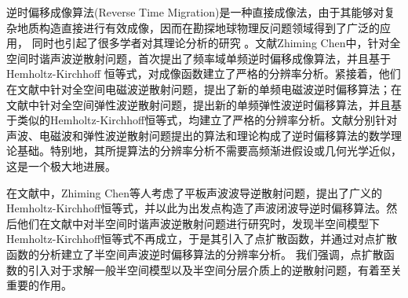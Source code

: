 逆时偏移成像算法(Reverse Time Migration)是一种直接成像法，由于其能够对复杂地质构造直接进行有效成像，因而在勘探地球物理反问题领域得到了广泛的应用，
同时也引起了很多学者对其理论分析的研究
。文献Zhiming Chen\cite{cch_a}中，针对全空间时谐声波逆散射问题，首次提出了频率域单频逆时偏移成像算法，并且基于Hemholtz-Kirchhoff 恒等式，对成像函数建立了严格的分辨率分析。紧接着，他们在文献\cite{cch_e}中针对全空间电磁波逆散射问题，提出了新的单频电磁波逆时偏移算法；在文献\cite{ch_e}中针对全空间弹性波逆散射问题，提出新的单频弹性波逆时偏移算法，并且基于类似的Hemholtz-Kirchhoff恒等式，均建立了严格的分辨率分析。文献\cite{cch_a,cch_e,ch_e}分别针对声波、电磁波和弹性波逆散射问题提出的算法和理论构成了逆时偏移算法的数学理论基础。特别地，其所提算法的分辨率分析不需要高频渐进假设或几何光学近似，这是一个极大地进展。

在文献\cite{ch_cw}中，Zhiming Chen等人考虑了平板声波波导逆散射问题，提出了广义的Hemholtz-Kirchhoff恒等式，并以此为出发点构造了声波闭波导逆时偏移算法。然后他们在文献\cite{ch_ha}中对半空间时谐声波逆散射问题进行研究时，发现半空间模型下Hemholtz-Kirchhoff恒等式不再成立，于是其引入了点扩散函数，并通过对点扩散函数的分析建立了半空间声波逆时偏移算法的分辨率分析。
我们强调，点扩散函数的引入对于求解一般半空间模型以及半空间分层介质上的逆散射问题，有着至关重要的作用。

